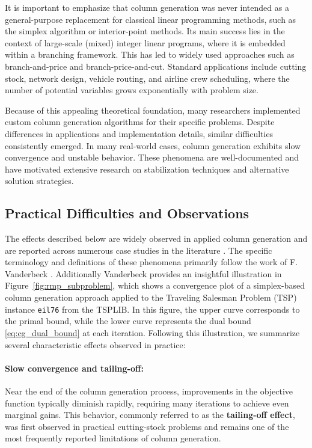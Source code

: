 \documentclass{book}
\theoremstyle{definition}
\newcounter{algorithm_}
\numberwithin{algorithm_}{chapter}
\begin{document}
\bigskip

It is important to emphasize that column generation was never intended as a general-purpose replacement for classical linear programming methods, such as the simplex algorithm or interior-point methods. Its main success lies in the context of large-scale (mixed) integer linear programs, where it is embedded within a branching framework. This has led to widely used approaches such as branch-and-price and branch-price-and-cut. Standard applications include cutting stock, network design, vehicle routing, and airline crew scheduling, where the number of potential variables grows exponentially with problem size.

\bigskip

Because of this appealing theoretical foundation, many researchers implemented custom column generation algorithms for their specific problems. Despite differences in applications and implementation details, similar difficulties consistently emerged. In many real-world cases, column generation exhibits slow convergence and unstable behavior. These phenomena are well-documented and have motivated extensive research on stabilization techniques and alternative solution strategies.

\subsection{Practical Difficulties and Observations}

The effects described below are widely observed in applied column generation and are reported across numerous case studies in the literature \cite{Lubbecke2011, vanderbeck2005}. The specific terminology and definitions of these phenomena primarily follow the work of F. Vanderbeck \cite{vanderbeck2005}. Additionally Vanderbeck provides an insightful illustration in Figure~\ref{fig:rmp_subproblem}, which shows a convergence plot of a simplex-based column generation approach applied to the Traveling Salesman Problem (TSP) instance \texttt{eil76} from the \textsc{TSPLIB}. In this figure, the upper curve corresponds to the primal bound, while the lower curve represents the dual bound \eqref{eq:cg_dual_bound} at each iteration. Following this illustration, we summarize several characteristic effects observed in practice: 

\paragraph{Slow convergence and tailing-off:}
Near the end of the column generation process, improvements in the objective function typically diminish rapidly, requiring many iterations to achieve even marginal gains. This behavior, commonly referred to as the \textbf{tailing-off effect}, was first observed in practical cutting-stock problems \cite{gilmoreGomory1961} and remains one of the most frequently reported limitations of column generation.
\end{document}
